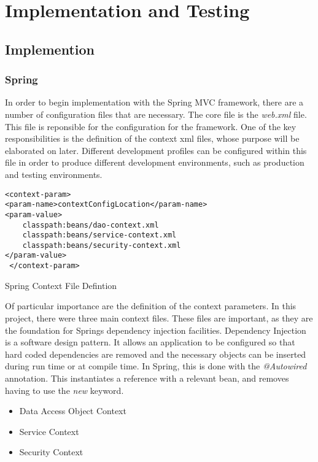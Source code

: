 \chapter{Implementation and Testing}
\label{impltesting}

\section{Implemention}
\subsection{Spring}
In order to begin implementation with the Spring MVC framework, there are a number of configuration files that are necessary. The core file is the \textit{web.xml} file. This file is reponsible for the configuration for the framework. One of the key responsibilities is the definition of the context xml files, whose purpose will be elaborated on later. Different development profiles can be configured within this file in order to produce different development environments, such as production and testing environments.\newline 

\begin{table}[H]
\begin{lstlisting}
<context-param>
<param-name>contextConfigLocation</param-name>
<param-value>
	classpath:beans/dao-context.xml
	classpath:beans/service-context.xml
	classpath:beans/security-context.xml
</param-value>
 </context-param>
\end{lstlisting}
\caption{Spring Context File Defintion}
\end{table}

Of particular importance are the definition of the context parameters. In this project, there were three main context files. These files are important, as they are the foundation for Springs dependency injection facilities. Dependency Injection is a software design pattern. It allows an application to be configured so that hard coded dependencies are removed and the necessary objects can be inserted during run time or at compile time. In Spring, this is done with the \textit{@Autowired} annotation. This instantiates a reference with a relevant bean, and removes having to use the \textit{new} keyword. \newline

\begin{itemize}
\item Data Access Object Context
\item Service Context
\item Security Context
\end{itemize}

